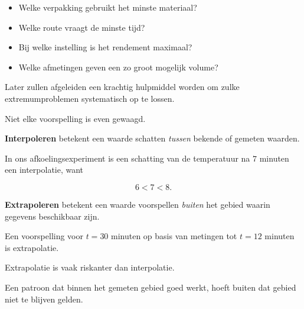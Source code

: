 \documentclass{ximera}
\begin{document}
\begin{itemize}
  \item Welke verpakking gebruikt het minste materiaal?
  \item Welke route vraagt de minste tijd?
  \item Bij welke instelling is het rendement maximaal?
  \item Welke afmetingen geven een zo groot mogelijk volume?
\end{itemize}

Later zullen afgeleiden een krachtig hulpmiddel worden om zulke
extremumproblemen systematisch op te lossen.




Niet elke voorspelling is even gewaagd.

\begin{definitie}[Interpoleren]

\textbf{Interpoleren} betekent een waarde schatten
\emph{tussen} bekende of gemeten waarden.

\end{definitie}

In ons afkoelingsexperiment is een schatting van de temperatuur na
$7$ minuten een interpolatie, want

\[
6<7<8.
\]

\begin{definitie}[Extrapoleren]

\textbf{Extrapoleren} betekent een waarde voorspellen
\emph{buiten} het gebied waarin gegevens beschikbaar zijn.

\end{definitie}

Een voorspelling voor $t=30$ minuten op basis van metingen tot
$t=12$ minuten is extrapolatie.

\begin{opmerking}
Extrapolatie is vaak riskanter dan interpolatie.

Een patroon dat binnen het gemeten gebied goed werkt, hoeft buiten dat
gebied niet te blijven gelden.
\end{opmerking}
\end{document}
